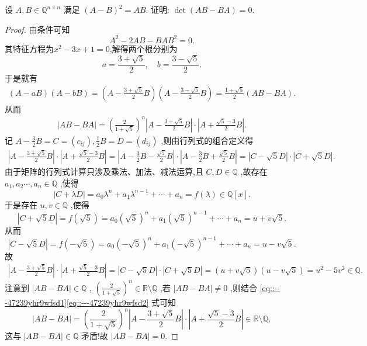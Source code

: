\documentclass[../../main.tex]{subfiles}%
\begin{document}
\begin{example}
设 $A,B\in \mathbb{Q}^{n\times n}$ 满足 $(A-B)^2=AB$. 证明: $\det(AB-BA)=0$.
\end{example}
\begin{proof}
由条件可知
$$A^2-2AB-BAB^2=0.$$
其特征方程为$x^2-3x+1=0$,解得两个根分别为
$$a=\frac{3+\sqrt{5}}{2},\quad b=\frac{3-\sqrt{5}}{2}.$$
于是就有
\begin{align*}
\left( A-aB \right) \left( A-bB \right) =\left( A-\frac{3+\sqrt{5}}{2}B \right) \left( A-\frac{3-\sqrt{5}}{2}B \right) =\frac{1+\sqrt{5}}{2}\left( AB-BA \right) .
\end{align*}
从而
\begin{align}
\left| AB-BA \right|=\left( \frac{2}{1+\sqrt{5}} \right) ^n\left| A-\frac{3+\sqrt{5}}{2}B \right|\cdot \left| A+\frac{\sqrt{5}-3}{2}B \right|.
\label{eq::---47239yhr9wfsd1}
\end{align}
记 $A-\frac{3}{2}B=C=\left( c_{ij} \right) ,\frac{1}{2}B=D=\left( d_{ij} \right)$ ,则由行列式的组合定义得
\begin{align*}
\left| A-\frac{3+\sqrt{5}}{2}B \right|\cdot \left| A+\frac{\sqrt{5}-3}{2}B \right|=\left| A-\frac{3}{2}B-\frac{\sqrt{5}}{2}B \right|\cdot \left| A-\frac{3}{2}B+\frac{\sqrt{5}}{2}B \right| 
=\left| C-\sqrt{5}D \right|\cdot \left| C+\sqrt{5}D \right|.
\end{align*}
由于矩阵的行列式计算只涉及乘法、加法、减法运算,且 $C,D\in \mathbb{Q}$ ,故存在 
$a_1,a_2\cdots ,a_n\in \mathbb{Q}$ ,使得
$$\left| C+\lambda D \right|=a_0\lambda ^n+a_1\lambda ^{n-1}+\cdots +a_n=f\left( \lambda \right) \in \mathbb{Q} \left[ x \right] .$$
于是存在 $u,v\in \mathbb{Q}$ ,使得
$$\left| C+\sqrt{5}D \right|=f\left( \sqrt{5} \right) =a_0\left( \sqrt{5} \right) ^n+a_1\left( \sqrt{5} \right) ^{n-1}+\cdots +a_n=u+v\sqrt{5}.$$
从而
$$\left| C-\sqrt{5}D \right|=f\left( -\sqrt{5} \right) =a_0\left( -\sqrt{5} \right) ^n+a_1\left( -\sqrt{5} \right) ^{n-1}+\cdots +a_n=u-v\sqrt{5}.$$
故
\begin{align}
\left| A-\frac{3+\sqrt{5}}{2}B \right|\cdot \left| A+\frac{\sqrt{5}-3}{2}B \right|=\left| C-\sqrt{5}D \right|\cdot \left| C+\sqrt{5}D \right| 
=\left( u+v\sqrt{5} \right) \left( u-v\sqrt{5} \right) =u^2-5v^2\in \mathbb{Q}.
\label{eq::---47239yhr9wfsd2}
\end{align}
注意到 $\left| AB-BA \right|\in \mathbb{Q}$ , $\left( \frac{2}{1+\sqrt{5}} \right) ^n\in \mathbb{R} \setminus \mathbb{Q}$ ,若 $\left| AB-BA \right|\ne 0$ ,则结合 \eqref{eq::---47239yhr9wfsd1}\eqref{eq::---47239yhr9wfsd2} 式可知
$$\left| AB-BA \right|=\left( \frac{2}{1+\sqrt{5}} \right) ^n\left| A-\frac{3+\sqrt{5}}{2}B \right|\cdot \left| A+\frac{\sqrt{5}-3}{2}B \right|\in \mathbb{R} \setminus \mathbb{Q},$$
这与 $\left| AB-BA \right|\in \mathbb{Q}$ 矛盾!故 $\left| AB-BA \right|=0$.
\end{proof}
\end{document}
